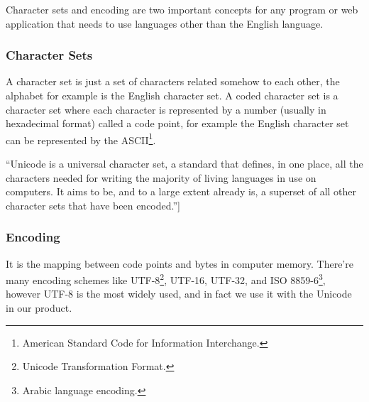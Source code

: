 Character sets and encoding are two important concepts for any program or web application that needs to use languages other than the English language.

\subsubsection{Character Sets}
	A character set is just a set of characters related somehow to each other, the alphabet for example is the English character set.
	A coded character set is a character set where each character is represented by a number (usually in hexadecimal format) called a code point\cite{char_enc}, for example the English character set can be represented by the ASCII\footnote{American Standard Code for Information Interchange.}.
	
	``Unicode is a universal character set, a standard that defines, in one place, all the characters needed for writing the majority of living languages in use on computers. It aims to be, and to a large extent already is, a superset of all other character sets that have been encoded.''\cite{char_enc}]
	
\subsubsection{Encoding}
	It is the mapping between code points and bytes in computer memory. There're many encoding schemes like UTF-8\footnote{Unicode Transformation Format.}, UTF-16, UTF-32, and ISO 8859-6\footnote{Arabic language encoding.}, however UTF-8 is the most widely used, and in fact we use it with the Unicode in our product.